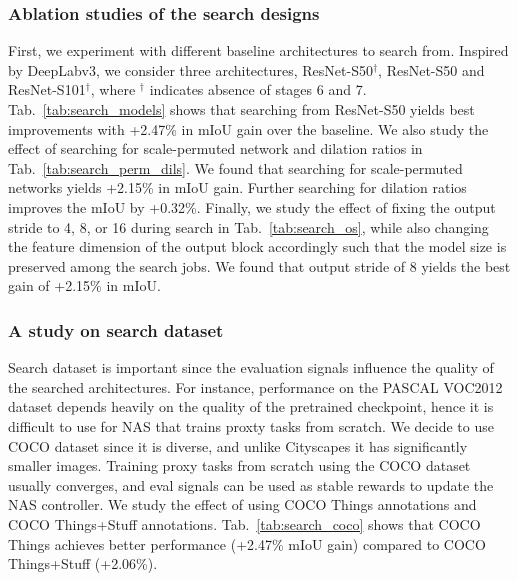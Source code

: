 \documentclass[10pt,twocolumn,letterpaper]{article}
\begin{document}
\subsubsection{Ablation studies of the search designs}
First, we experiment with different baseline architectures to search from. Inspired by DeepLabv3, we consider three architectures, ResNet-S50$^\dagger$, ResNet-S50 and ResNet-S101$^\dagger$, where $^\dagger$ indicates absence of stages 6 and 7. Tab.~\ref{tab:search_models} shows that searching from ResNet-S50 yields best improvements with +2.47\% in mIoU gain over the baseline.
We also study the effect of searching for scale-permuted network and dilation ratios in Tab.~\ref{tab:search_perm_dils}. We found that searching for scale-permuted networks yields +2.15\% in mIoU gain. Further searching for dilation ratios improves the mIoU by +0.32\%.
Finally, we study the effect of fixing the output stride to 4, 8, or 16 during search in Tab.~\ref{tab:search_os}, while also changing the feature dimension of the output block accordingly such that the model size is preserved among the search jobs. We found that output stride of 8 yields the best gain of +2.15\% in mIoU.

\subsubsection{A study on search dataset}
Search dataset is important since the evaluation signals influence the quality of the searched architectures. For instance, performance on the PASCAL VOC2012 dataset depends heavily on the quality of the pretrained checkpoint, hence it is difficult to use for NAS that trains proxty tasks from scratch. We decide to use COCO dataset since it is diverse, and unlike Cityscapes it has significantly smaller images. Training proxy tasks from scratch using the COCO dataset usually converges, and eval signals can be used as stable rewards to update the NAS controller. We study the effect of using COCO Things annotations and COCO Things+Stuff annotations. Tab.~\ref{tab:search_coco} shows that COCO Things achieves better performance (+2.47\% mIoU gain) compared to COCO Things+Stuff (+2.06\%).
\end{document}
